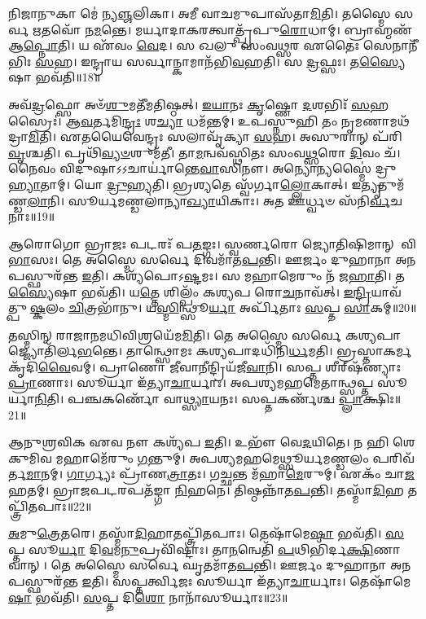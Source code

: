 𑌨𑌿𑌜𑌾𑌨𑍁𑌕𑌾 𑌮𑍇॑ 𑌨𑍍𑌯\-\ul{𑌞𑍍𑌜}\-𑌲𑌿𑌕𑌾। 𑌅𑌮𑍀 𑌵𑌾𑌚𑌮𑍁𑌪𑌾𑌸᳴𑌤𑌾\-\ul{𑌮𑌿}\-𑌤𑌿। 
𑌤𑌸𑍍𑌮𑍈 𑌸𑌰𑍍𑌵 𑌋𑌤𑌵𑍋᳴ 𑌨\-\ul{𑌮}\-𑌨𑍍𑌤𑍇। 𑌮𑌰𑍍𑌯𑌾𑌦𑌾𑌕𑌰𑌤𑍍𑌵𑌾𑌤𑍍𑌪𑍍𑌰᳴\-𑌪𑍁\-\ul{𑌰𑍋}\-𑌧𑌾𑌮𑍍। 
𑌬𑍍𑌰𑌾𑌹𑍍𑌮𑌣᳴ 𑌆\-\ul{𑌪𑍍𑌨𑍋}\-𑌤𑌿। 𑌯 𑌏᳴𑌵𑌂 \ul{𑌵𑍇}\-𑌦। 𑌸 𑌖𑌲𑍁 𑌸𑌂𑌵𑌥𑍍𑌸𑌰 𑌏𑌤𑍈𑌃 𑌸𑍇𑌨𑌾𑌨𑍀᳴𑌭𑌿𑌃 \ul{𑌸}\-𑌹। 
𑌇𑌨𑍍𑌦𑍍𑌰𑌾𑌯 𑌸𑌰𑍍𑌵𑌾𑌨𑍍𑌕𑌾𑌮𑌾𑌨᳴𑌭𑌿\-\ul{𑌵}\-𑌹𑌤𑌿। 𑌸 \ul{𑌦𑍍𑌰}\-𑌫𑍍𑌸𑌃। 𑌤\-\ul{𑌸𑍍𑌯𑍈}\-𑌷𑌾 𑌭𑌵᳴𑌤𑌿॥18॥

𑌅𑌵᳴\-\ul{𑌦𑍍𑌰}\-𑌫𑍍𑌸𑍋 𑌅𑍞᳴\-\ul{𑌶𑍁}\-𑌮𑌤𑍀᳴𑌮𑌤𑌿𑌷𑍍𑌠𑌤𑍍। \ul{𑌇}\-\-\ul{𑌯𑌾}\-𑌨𑌃 \ul{𑌕𑍃}\-𑌷𑍍𑌣𑍋 \ul{𑌦}\-𑌶𑌭𑌿𑌃᳴ \ul{𑌸}\-𑌹𑌸𑍍𑌰𑍈𑌃॑। 
𑌆\-\ul{𑌵}\-𑌰𑍍𑌤𑌮𑌿\-\ul{𑌨𑍍𑌦𑍍𑌰𑌃} 𑌶\-\ul{𑌚𑍍𑌯𑌾} 𑌧𑌮᳴𑌨𑍍𑌤𑌮𑍍। 𑌉𑌪𑌸𑍍𑌨𑍁𑌹𑌿 𑌤𑌂 𑌨𑍃𑌮𑌣𑌾𑌮𑌥᳴𑌦𑍍𑌰𑌾\-\ul{𑌮𑌿}\-𑌤𑌿। 
𑌏𑌤𑌯𑍈𑌵𑍇𑌨𑍍𑌦𑍍𑌰𑌃 𑌸𑌲𑌾𑌵𑍃᳴𑌕𑍍𑌯𑌾 \ul{𑌸}\-𑌹। 𑌅𑌸𑍁𑌰𑌾𑌨𑍍‌ 𑌪᳴𑌰𑌿\-\ul{𑌵𑍃}\-𑌶𑍍𑌚𑌤𑌿। 
𑌪𑍃𑌥𑌿᳴\-\ul{𑌵𑍍𑌯}\-\-\ul{𑍞}\-𑌶𑍁𑌮᳴𑌤𑍀। 𑌤𑌾\-\ul{𑌮}\-𑌨𑍍𑌵𑌵᳴𑌸𑍍𑌥𑌿𑌤𑌃 𑌸𑌂𑌵\-\ul{𑌥𑍍𑌸}\-𑌰𑍋 \ul{𑌦𑌿}\-𑌵𑌂 𑌚᳴। 
𑌨𑍈𑌵𑌂 𑌵𑌿𑌦𑍁𑌷𑌾𑌽𑌽𑌚𑌾𑌰𑍍𑌯𑌾॑𑌨𑍍𑌤𑍇\-\ul{𑌵𑌾}\-𑌸𑌿𑌨𑍗। 𑌅𑌨𑍍𑌯𑍋𑌨𑍍𑌯𑌸𑍍𑌮𑍈॑ 𑌦𑍍𑌰𑍁\-\ul{𑌹𑍍𑌯𑌾}\-𑌤𑌾𑌮𑍍। 𑌯𑍋 \ul{𑌦𑍍𑌰𑍁}\-𑌹𑍍𑌯𑌤𑌿। 
𑌭𑍍𑌰𑌶𑍍𑌯𑌤𑍇 𑌸𑍍𑌵᳴𑌰𑍍𑌗𑌾\-\ul{𑌲𑍍𑌲𑍋}\-𑌕𑌾𑌤𑍍। 𑌇𑌤𑍍𑌯𑍃𑌤𑍁𑌮᳴𑌣𑍍𑌡\-\ul{𑌲𑌾}\-𑌨𑌿। 
𑌸𑍂𑌰𑍍𑌯𑌮𑌣𑍍𑌡𑌲𑌾॑𑌨𑍍𑌯𑌾\-\-\ul{𑌖𑍍𑌯𑌾}\-𑌯𑌿𑌕𑌾𑌃। 𑌅𑌤 𑌊𑌰𑍍𑌧𑍍𑌵𑍞 𑌸᳴𑌨𑌿\-\ul{𑌰𑍍𑌵}\-𑌚𑌨𑌾𑌃॥19॥\anuvakamend


𑌆𑌰𑍋𑌗𑍋 𑌭𑍍𑌰𑌾𑌜𑌃 𑌪𑌟𑌰𑌃᳴ 𑌪\-\ul{𑌤}\-𑌙𑍍𑌗𑌃। 𑌸𑍍𑌵𑌰𑍍𑌣𑌰𑍋 𑌜𑍍𑌯𑍋𑌤𑌿𑌷𑌿𑌮𑌾𑌨𑍍 𑌵𑌿\-\ul{𑌭𑌾}\-𑌸𑌃। 
𑌤𑍇 𑌅𑌸𑍍𑌮𑍈 𑌸𑌰𑍍𑌵𑍇 𑌦𑌿𑌵𑌮𑌾᳴𑌤\-\ul{𑌪}\-𑌨𑍍𑌤𑌿। 𑌊𑌰𑍍𑌜𑌂 𑌦𑍁𑌹𑌾𑌨𑌾 𑌅𑌨𑌪𑌸𑍍𑌫𑍁𑌰᳴𑌨𑍍𑌤 \ul{𑌇}\-𑌤𑌿। 
𑌕𑌶𑍍𑌯᳴𑌪𑍋𑌽\-\ul{𑌷𑍍𑌟}\-𑌮𑌃। 𑌸 𑌮𑌹𑌾𑌮𑍇𑌰𑍁𑌂 𑌨᳴ 𑌜\-\ul{𑌹𑌾}\-𑌤𑌿। 
𑌤\-\ul{𑌸𑍍𑌯𑍈}\-𑌷𑌾 𑌭𑌵᳴𑌤𑌿। 𑌯\-\ul{𑌤𑍍𑌤𑍇} 𑌶𑌿𑌲𑍍𑌪𑌂᳴ 𑌕𑌶𑍍𑌯𑌪 𑌰𑍋\-\ul{𑌚}\-𑌨𑌾𑌵᳴𑌤𑍍। 
\-\ul{𑌇}\-\-\ul{𑌨𑍍𑌦𑍍𑌰𑌿}\-𑌯𑌾𑌵᳴𑌤𑍍𑌪𑍁\-\ul{𑌷𑍍𑌕}\-𑌲𑌂 \ul{𑌚𑌿}\-𑌤𑍍𑌰𑌭𑌾᳴𑌨𑍁। 𑌯\-\ul{𑌸𑍍𑌮𑌿}\-𑌨𑍍𑌥𑍍𑌸𑍂\-\ul{𑌰𑍍𑌯𑌾} 𑌅𑌰𑍍𑌪𑌿᳴𑌤𑌾𑌃 \ul{𑌸}\-𑌪𑍍𑌤 \ul{𑌸𑌾}\-𑌕𑌮𑍍॥20॥

𑌤𑌸𑍍𑌮𑌿𑌨𑍍‌ 𑌰𑌾𑌜𑌾𑌨𑌮𑌧𑌿𑌵𑌿𑌶𑍍𑌰𑌯𑍇᳴𑌮\-\ul{𑌮𑌿}\-𑌤𑌿। 𑌤𑍇 𑌅𑌸𑍍𑌮𑍈 𑌸𑌰𑍍𑌵𑍇 𑌕𑌶𑍍𑌯𑌪𑌾𑌜𑍍𑌜𑍍𑌯𑍋\-𑌤𑌿᳴𑌰𑍍𑌲\-\ul{𑌭}\-𑌨𑍍𑌤𑍇। 
𑌤𑌾𑌨𑍍𑌥𑍍𑌸𑍋𑌮𑌃 𑌕𑌶𑍍𑌯𑌪𑌾𑌦𑌧𑌿᳴𑌨𑌿\-\ul{𑌰𑍍𑌧}\-𑌮𑌤𑌿। 𑌭𑍍𑌰𑌸𑍍𑌤𑌾𑌕𑌰𑍍𑌮𑌕𑍃᳴𑌦𑌿\-\ul{𑌵𑍈}\-𑌵𑌮𑍍। 
𑌪𑍍𑌰𑌾𑌣𑍋 𑌜𑍀𑌵𑌾𑌨𑍀𑌨𑍍𑌦𑍍𑌰𑌿𑌯᳴𑌜𑍀\-\ul{𑌵𑌾}\-𑌨𑌿। 𑌸𑌪𑍍𑌤 𑌶𑍀𑌰𑍍‌𑌷᳴𑌣𑍍𑌯𑌾𑌃 \ul{𑌪𑍍𑌰𑌾}\-𑌣𑌾𑌃। 
𑌸𑍂𑌰𑍍𑌯𑌾 𑌇᳴𑌤𑍍𑌯𑌾\-\ul{𑌚𑌾}\-𑌰𑍍𑌯𑌾𑌃। 𑌅𑌪𑌶𑍍𑌯𑌮𑌹𑌮𑍇𑌤𑌾𑌨𑍍𑌥𑍍𑌸𑌪𑍍𑌤 𑌸𑍂॑𑌰𑍍𑌯𑌾\-\ul{𑌨𑌿}\-𑌤𑌿। 
𑌪𑌞𑍍𑌚\-𑌕𑌰𑍍𑌣𑍋᳴ 𑌵𑌾\-\ul{𑌥𑍍𑌸𑍍𑌯𑌾}\-𑌯𑌨𑌃। 𑌸𑌪𑍍𑌤𑌕𑌰𑍍𑌣᳴𑌶𑍍𑌚 \ul{𑌪𑍍𑌲𑌾}\-𑌕𑍍𑌷𑌿𑌃॥21॥

𑌆𑌨𑍁𑌶𑍍𑌰𑌵𑌿𑌕 𑌏𑌵 𑌨𑍗 𑌕𑌶𑍍𑌯᳴𑌪 \ul{𑌇}\-𑌤𑌿। 𑌉𑌭𑍗᳴ 𑌵𑍇\-\ul{𑌦}\-𑌯𑌿𑌤𑍇। 
𑌨 𑌹𑌿 𑌶𑍇𑌕𑍁𑌮𑌿𑌵 𑌮𑌹𑌾𑌮𑍇᳴𑌰𑍁𑌂 \ul{𑌗}\-𑌨𑍍𑌤𑍁𑌮𑍍। 𑌅𑌪𑌶𑍍𑌯𑌮𑌹𑌮𑍇𑌥𑍍𑌸𑍂𑌰𑍍𑌯𑌮𑌣𑍍𑌡𑌲𑌂 𑌪𑌰𑌿𑌵᳴𑌰𑍍𑌤\-\ul{𑌮𑌾}\-𑌨𑌮𑍍। 
\-\ul{𑌗𑌾}\-𑌰𑍍𑌗𑍍𑌯𑌃 𑌪𑍍𑌰𑌾᳴𑌣\-\ul{𑌤𑍍𑌰𑌾}\-𑌤𑌃। 𑌗𑌚𑍍𑌛𑌨𑍍𑌤 𑌮᳴𑌹𑌾\-\ul{𑌮𑍇}\-𑌰𑍁𑌮𑍍। 𑌏𑌕𑌂᳴ 𑌚𑌾\-\ul{𑌜}\-𑌹𑌤𑌮𑍍। 
𑌭𑍍𑌰𑌾𑌜𑌪𑌟𑌰𑌪𑌤᳴𑌙𑍍𑌗𑌾 \ul{𑌨𑌿}\-𑌹𑌨𑍇। 𑌤𑌿𑌷𑍍𑌠𑌨𑍍𑌨𑌾᳴𑌤\-\ul{𑌪}\-𑌨𑍍𑌤𑌿। 𑌤𑌸𑍍𑌮𑌾᳴\-\ul{𑌦𑌿}\-𑌹 𑌤𑌪𑍍𑌤𑍍𑌰𑌿᳴𑌤𑌪𑌾𑌃॥22॥

\-\ul{𑌅}\-𑌮𑍁\-\ul{𑌤𑍍𑌰𑍇}\-𑌤𑌰𑍇। 𑌤𑌸𑍍𑌮𑌾᳴\-\ul{𑌦𑌿}\-𑌹𑌾𑌤𑌪𑍍𑌤𑍍𑌰𑌿᳴𑌤𑌪𑌾𑌃। 𑌤𑍇𑌷𑌾᳴𑌮𑍇\-\ul{𑌷𑌾} 𑌭𑌵᳴𑌤𑌿। 
\-\ul{𑌸}\-𑌪𑍍𑌤 𑌸𑍂\-\ul{𑌰𑍍𑌯𑌾} 𑌦𑌿\-\ul{𑌵}\-𑌮\-\ul{𑌨𑍁}\-𑌪𑍍𑌰𑌵𑌿᳴𑌷𑍍𑌟𑌾𑌃। 𑌤𑌾\-\ul{𑌨}\-𑌨𑍍𑌵𑍇𑌤𑌿᳴ \ul{𑌪}\-𑌥𑌿𑌭𑌿᳴𑌰𑍍𑌦\-\ul{𑌕𑍍𑌷𑌿}\-𑌣𑌾𑌵𑌾𑌨𑍍। 
𑌤𑍇 𑌅𑌸𑍍𑌮𑍈 𑌸𑌰𑍍𑌵𑍇 𑌘𑍃𑌤𑌮𑌾᳴𑌤\-\ul{𑌪}\-𑌨𑍍𑌤𑌿। 𑌊𑌰𑍍𑌜𑌂 𑌦𑍁𑌹𑌾𑌨𑌾 𑌅𑌨𑌪𑌸𑍍𑌫𑍁𑌰᳴𑌨𑍍𑌤 \ul{𑌇}\-𑌤𑌿। 
𑌸𑌪𑍍𑌤𑌰𑍍𑌤𑍍𑌵𑌿𑌜𑌃 𑌸𑍂𑌰𑍍𑌯𑌾 𑌇᳴𑌤𑍍𑌯𑌾\-\ul{𑌚𑌾}\-𑌰𑍍𑌯𑌾𑌃। 𑌤𑍇𑌷𑌾᳴𑌮𑍇\-\ul{𑌷𑌾} 𑌭𑌵᳴𑌤𑌿। \ul{𑌸}\-𑌪𑍍𑌤 𑌦𑌿\-\ul{𑌶𑍋} 𑌨𑌾𑌨𑌾᳴𑌸𑍂𑌰𑍍𑌯𑌾𑌃॥23॥

